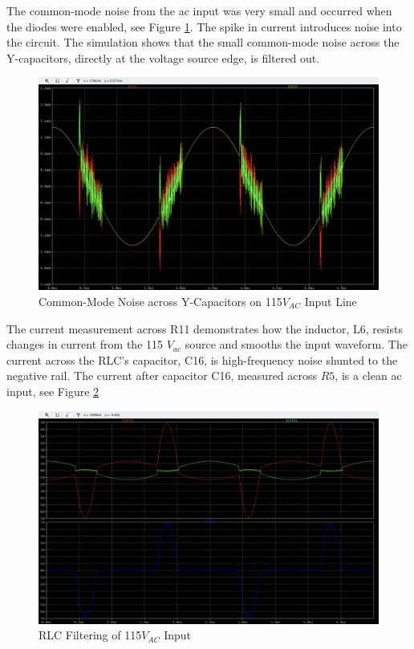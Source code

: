 \documentclass[conference]{IEEEtran}
\begin{document}
The common-mode noise from the ac input was very small and occurred when the diodes were enabled, see Figure \ref{fig:ac_input_common_mode_y_cap_noise_waveform}. The spike in current introduces noise into the circuit. The simulation shows that the small common-mode noise across the Y-capacitors, directly at the voltage source edge, is filtered out.

\begin{figure}[htp]
    \centering
    \includegraphics[width=1.0\linewidth]{ac_input_common_mode_y_cap_noise_waveform.png}
    \caption{Common-Mode Noise across Y-Capacitors on 115$V_{AC}$ Input Line}
    \label{fig:ac_input_common_mode_y_cap_noise_waveform}
\end{figure}

The current measurement across R11 demonstrates how the inductor, L6, resists changes in current from the 115 $V_{ac}$ source and smooths the input waveform. The current across the RLC's capacitor, C16, is high-frequency noise shunted to the negative rail. The current after capacitor C16, measured across $R5$, is a clean ac input, see Figure \ref{fig:ac_input_rlc_waveforms}

\begin{figure}[htp]
    \centering
    \includegraphics[width=1.0\linewidth]{ac_input_rlc_waveforms.png}
    \caption{RLC Filtering of 115$V_{AC}$ Input}
    \label{fig:ac_input_rlc_waveforms}
\end{figure}
\end{document}
